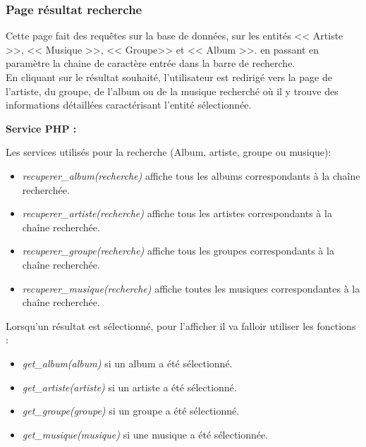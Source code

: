 
        \clearpage

		\subsubsection{Page résultat recherche}

			\begin{paragraphe}
				Cette page fait des requêtes sur la base de données, sur les entités << Artiste >>, << Musique >>, << Groupe>> et << Album >>.
				 en passant en paramètre la chaine de caractère entrée dans la barre de recherche.\\
                En cliquant sur le résultat souhaité, l'utilisateur est redirigé vers la page de l'artiste, du groupe, de l'album ou de la musique
                 recherché où il y trouve des informations détaillées caractérisant l'entité sélectionnée.
            \end{paragraphe}

            \begin{paragraphe}
                \textbf{Service PHP :}
            \end{paragraphe}

            \begin{paragraphe}
                Les services utilisés pour la recherche (Album, artiste, groupe ou musique):
                 \begin{itemize}
                     \item \emph{recuperer\_album(recherche)} affiche tous les albums correspondants à la chaîne recherchée.
                     \item \emph{recuperer\_artiste(recherche)} affiche tous les artistes correspondants à la chaîne recherchée.
                     \item \emph{recuperer\_groupe(recherche)} affiche tous les groupes correspondants à la chaîne recherchée.
                     \item \emph{recuperer\_musique(recherche)} affiche toutes les musiques correspondantes à la chaîne recherchée.
                 \end{itemize}
             \end{paragraphe}

            \begin{paragraphe}
                 Lorsqu'un résultat est sélectionné, pour l'afficher il va falloir utiliser les fonctions :
                \begin{itemize}
                    \item \emph{get\_album(album)} si un album a été sélectionné.
                    \item \emph{get\_artiste(artiste)} si un artiste a été sélectionné.
                    \item \emph{get\_groupe(groupe)} si un groupe a été sélectionné.
                    \item \emph{get\_musique(musique)} si une musique a été sélectionnée.
                \end{itemize}
            \end{paragraphe}

